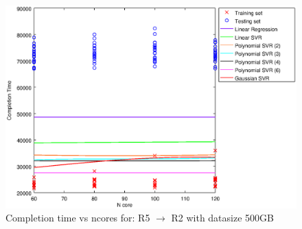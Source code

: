 
\begin {figure}[hbtp]
\centering
\includegraphics[width=\textwidth]{output/R5_R2_500_ALL_FEATURES/plot_R5_R2_500.eps}
\caption{Completion time vs ncores for: R5 $\rightarrow$ R2 with datasize 500GB}
\label{fig:coreonly_linear_R5_R2_500}
\end {figure}
